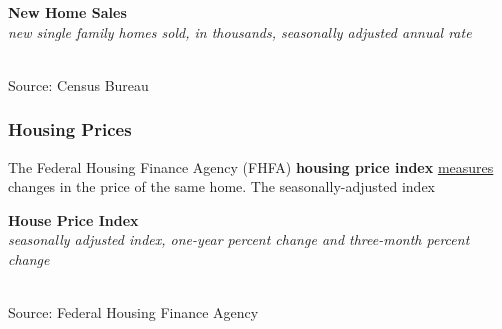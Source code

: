 \documentclass{report}
\makeatletter
\newcommand{\tbllink}[1]{\href{https://raw.githubusercontent.com/bdecon/US-chartbook/master/chartbook/data/#1}{\faTable}}
\newcommand*\short[1]{\expandafter\@gobbletwo\number\numexpr#1\relax}
\newcommand{\dateaxisticks}{
		date coordinates in=x, axis line style={draw=none},
		xmax={2022-03-15},
		max space between ticks=40,	    
		xtick={{1990-01-01}, {1992-01-01}, {1994-01-01}, 
			{1996-01-01}, {1998-01-01}, {2000-01-01}, 
			{2002-01-01}, {2004-01-01}, {2006-01-01},
			{2008-01-01}, {2010-01-01}, {2012-01-01}, {2014-01-01},
		    {2016-01-01}, {2018-01-01}, {2020-01-01}, {2022-01-01}, 
		    {2024-01-01}, {2026-01-01}},
		minor xtick={{1989-01-01}, {1991-01-01}, {1993-01-01},
			{1995-01-01}, {1997-01-01}, {1999-01-01}, 
			{2001-01-01}, {2003-01-01}, {2005-01-01}, {2007-01-01},
		    {2009-01-01}, {2011-01-01}, {2013-01-01}, {2015-01-01},
		    {2017-01-01}, {2019-01-01}, {2021-01-01}, {2023-01-01}, 
		    {2025-01-01}, {2027-01-01}},
		enlarge y limits={0.06}, enlarge x limits={0.01},
		}
\newcommand{\bbar}[2]{extra #1 ticks = {{#2}}, extra #1 tick labels = ,
		extra #1 tick style = {grid=major, grid style={thick, black!25}},}
\newcommand{\stdline}[4]{\addplot[very thick, no markers, color=#1] 
		table [x=#2, y=#3, col sep=comma] {#4};	}
\newcommand{\thickline}[4]{\addplot[ultra thick, no markers, color=#1] 
		table [x=#2, y=#3, col sep=comma] {#4};	}
\newcommand{\rbars}{
		\fill[color=black!10] (axis cs:{1990-07-01},\pgfkeysvalueof{/pgfplots/ymin}) rectangle 
			(axis cs:{1991-03-01}, \pgfkeysvalueof{/pgfplots/ymax});
		\fill[color=black!10] (axis cs:{2007-12-01},\pgfkeysvalueof{/pgfplots/ymin}) rectangle 
			(axis cs:{2009-07-01}, \pgfkeysvalueof{/pgfplots/ymax});
		\fill[color=black!10] (axis cs:{2001-03-01},\pgfkeysvalueof{/pgfplots/ymin}) rectangle 
			(axis cs:{2001-11-01}, \pgfkeysvalueof{/pgfplots/ymax});
		\fill[color=black!10] (axis cs:{2020-02-01},\pgfkeysvalueof{/pgfplots/ymin}) rectangle 
			(axis cs:{2020-05-01}, \pgfkeysvalueof{/pgfplots/ymax});}
\newcommand{\rebars}{
		\fill[color=black!10] (axis cs:{2007-12-01},\pgfkeysvalueof{/pgfplots/ymin}) rectangle 
			(axis cs:{2009-07-01}, \pgfkeysvalueof{/pgfplots/ymax});
		\fill[color=black!10] (axis cs:{2001-03-01},\pgfkeysvalueof{/pgfplots/ymin}) rectangle 
			(axis cs:{2001-11-01}, \pgfkeysvalueof{/pgfplots/ymax});
		\fill[color=black!10] (axis cs:{2020-02-01},\pgfkeysvalueof{/pgfplots/ymin}) rectangle 
			(axis cs:{2020-05-01}, \pgfkeysvalueof{/pgfplots/ymax});}
\makeatother
\begin{document}
{\begin{minipage}{0.76\textwidth}
\normalsize{\textbf{New Home Sales}}\\
\footnotesize{\textit{new single family homes sold, in thousands, seasonally adjusted annual rate}}\\
\hspace*{-2mm} \\
\footnotesize{Source: Census Bureau} \hfill \tbllink{nhs.csv}
\end{minipage}
\newpage
\subsubsection*{Housing Prices}
\begin{minipage}{0.76\textwidth}
\small The Federal Housing Finance Agency (FHFA) \textbf{housing price index} \href{https://www.fhfa.gov/DataTools/Downloads/Pages/House-Price-Index-Datasets.aspx}{measures} changes in the price of the same home. The seasonally-adjusted index 

\normalsize \textbf{House Price Index}\\
\footnotesize{\textit{seasonally adjusted index, one-year percent change and three-month percent change}}\\
\hspace*{-2mm} \\
\footnotesize{Source: Federal Housing Finance Agency} \hfill \tbllink{hpi.csv}
\vspace{1mm}


\end{minipage}}
\end{document}
